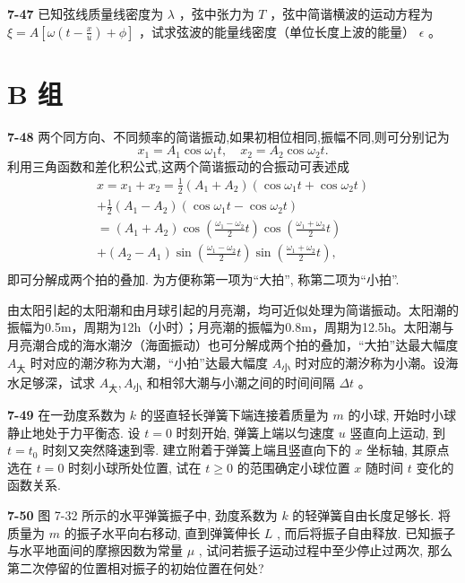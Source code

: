 \newpage

\textbf{7-47} 已知弦线质量线密度为 $\lambda$ ，弦中张力为 $T$ ，弦中简谐横波的运动方程为 $\xi = A\left[\omega\left(t - \frac{x}{u}\right) + \phi\right]$ ，试求弦波的能量线密度（单位长度上波的能量） $\epsilon$ 。


\newpage

\section*{B 组}
\vspace{0.3cm}
\textbf{7-48} 两个同方向、不同频率的简谐振动,如果初相位相同,振幅不同,则可分别记为
\[
x _ {1} = A _ {1} \cos \omega_ {1} t, \quad x _ {2} = A _ {2} \cos \omega_ {2} t.
\]
利用三角函数和差化积公式,这两个简谐振动的合振动可表述成
\[
\begin{array}{l} x = x _ {1} + x _ {2} = \frac {1}{2} (A _ {1} + A _ {2}) (\cos \omega_ {1} t + \cos \omega_ {2} t) \\ + \frac {1}{2} (A _ {1} - A _ {2}) (\cos \omega_ {1} t - \cos \omega_ {2} t) \\ = \left(A _ {1} + A _ {2}\right) \cos \left(\frac {\omega_ {1} - \omega_ {2}}{2} t\right) \cos \left(\frac {\omega_ {1} + \omega_ {2}}{2} t\right) \\ + \left(A _ {2} - A _ {1}\right) \sin \left(\frac {\omega_ {1} - \omega_ {2}}{2} t\right) \sin \left(\frac {\omega_ {1} + \omega_ {2}}{2} t\right), \\ \end{array}
\]
即可分解成两个拍的叠加. 为方便称第一项为“大拍”, 称第二项为“小拍”.

由太阳引起的太阳潮和由月球引起的月亮潮，均可近似处理为简谐振动。太阳潮的振幅为0.5m，周期为12h（小时）；月亮潮的振幅为0.8m，周期为12.5h。太阳潮与月亮潮合成的海水潮汐（海面振动）也可分解成两个拍的叠加，“大拍”达最大幅度 $A_{大}$ 时对应的潮汐称为大潮，“小拍”达最大幅度 $A_{小}$ 时对应的潮汐称为小潮。设海水足够深，试求 $A_{大}, A_{小}$ 和相邻大潮与小潮之间的时间间隔 $\Delta t$ 。

\newpage

\textbf{7-49} 在一劲度系数为 $k$ 的竖直轻长弹簧下端连接着质量为 $m$ 的小球, 开始时小球静止地处于力平衡态. 设 $t = 0$ 时刻开始, 弹簧上端以匀速度 $u$ 竖直向上运动, 到 $t = t_0$ 时刻又突然降速到零. 建立附着于弹簧上端且竖直向下的 $x$ 坐标轴, 其原点选在 $t = 0$ 时刻小球所处位置, 试在 $t \geqslant 0$ 的范围确定小球位置 $x$ 随时间 $t$ 变化的函数关系.

\newpage

\textbf{7-50} 图 7-32 所示的水平弹簧振子中, 劲度系数为 $k$ 的轻弹簧自由长度足够长. 将质量为 $m$ 的振子水平向右移动, 直到弹簧伸长 $L$ , 而后将振子自由释放. 已知振子与水平地面间的摩擦因数为常量 $\mu$ , 试问若振子运动过程中至少停止过两次, 那么第二次停留的位置相对振子的初始位置在何处?


